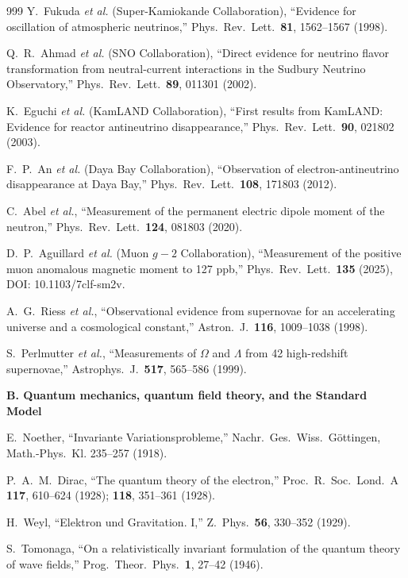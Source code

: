 \documentclass[11pt,a4paper,twoside]{book}
\theoremstyle{definition}
\begin{document}
\begin{thebibliography}{999}
Y.~Fukuda \emph{et al.} (Super-Kamiokande Collaboration),
``Evidence for oscillation of atmospheric neutrinos,''
Phys.\ Rev.\ Lett.\ \textbf{81}, 1562--1567 (1998).

Q.~R.~Ahmad \emph{et al.} (SNO Collaboration),
``Direct evidence for neutrino flavor transformation from neutral-current
interactions in the Sudbury Neutrino Observatory,''
Phys.\ Rev.\ Lett.\ \textbf{89}, 011301 (2002).

K.~Eguchi \emph{et al.} (KamLAND Collaboration),
``First results from KamLAND: Evidence for reactor antineutrino disappearance,''
Phys.\ Rev.\ Lett.\ \textbf{90}, 021802 (2003).

F.~P.~An \emph{et al.} (Daya Bay Collaboration),
``Observation of electron-antineutrino disappearance at Daya Bay,''
Phys.\ Rev.\ Lett.\ \textbf{108}, 171803 (2012).

C.~Abel \emph{et al.},
``Measurement of the permanent electric dipole moment of the neutron,''
Phys.\ Rev.\ Lett.\ \textbf{124}, 081803 (2020).

D.~P.~Aguillard \emph{et al.} (Muon $g-2$ Collaboration),
``Measurement of the positive muon anomalous magnetic moment to 127 ppb,''
Phys.\ Rev.\ Lett.\ \textbf{135} (2025), DOI: 10.1103/7clf-sm2v.

A.~G.~Riess \emph{et al.},
``Observational evidence from supernovae for an accelerating universe and a
cosmological constant,'' Astron.\ J.\ \textbf{116}, 1009--1038 (1998).

S.~Perlmutter \emph{et al.},
``Measurements of $\Omega$ and $\Lambda$ from 42 high-redshift supernovae,''
Astrophys.\ J.\ \textbf{517}, 565--586 (1999).

\item[]\textbf{B. Quantum mechanics, quantum field theory, and the Standard Model}

E.~Noether,
``Invariante Variationsprobleme,''
Nachr.\ Ges.\ Wiss.\ G\"ottingen, Math.-Phys.\ Kl. 235--257 (1918).

P.~A.~M.~Dirac,
``The quantum theory of the electron,''
Proc.\ R.\ Soc.\ Lond.\ A \textbf{117}, 610--624 (1928); \textbf{118},
351--361 (1928).

H.~Weyl,
``Elektron und Gravitation. I,''
Z.\ Phys.\ \textbf{56}, 330--352 (1929).

S.~Tomonaga,
``On a relativistically invariant formulation of the quantum theory of wave
fields,'' Prog.\ Theor.\ Phys.\ \textbf{1}, 27--42 (1946).


\end{thebibliography}
\end{document}
